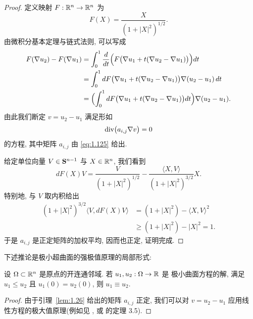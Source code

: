 \begin{proof}
定义映射 $F:\mathbb{R}^n\to\mathbb{R}^n$ 为
\begin{equation}
F(X)=\frac{X}{(1+|X|^2)^{1/2}}.
\label{eq:1.124}
\end{equation}
由微积分基本定理与链式法则, 可以写成
\begin{equation}
\begin{aligned}
F(\nabla u_2)-F(\nabla u_1)
&=\int_0^1\frac{d}{dt}
 \Bigl(F\bigl(\nabla u_1+t(\nabla u_2-\nabla u_1)\bigr)\Bigr)dt\\
&=\int_0^1 dF\bigl(\nabla u_1+t(\nabla u_2-\nabla u_1)\bigr)
 \nabla(u_2-u_1)\,dt\\
&=\Bigl(\int_0^1 dF\bigl(\nabla u_1+t(\nabla u_2-\nabla u_1)\bigr)dt
 \Bigr)\nabla(u_2-u_1).
\end{aligned}
\label{eq:1.125}
\end{equation}
由此我们断定 $v=u_2-u_1$ 满足形如
\begin{equation}
\operatorname{div}\bigl(a_{i,j}\nabla v\bigr)=0
\label{eq:1.126}
\end{equation}
的方程, 其中矩阵 $a_{i,j}$ 由 \eqref{eq:1.125} 给出.

给定单位向量 $V\in\mathbf{S}^{n-1}$ 与 $X\in\mathbb{R}^n$, 我们看到
\begin{equation}
dF(X)V=\frac{V}{(1+|X|^2)^{1/2}}
 -\frac{\langle X,V\rangle}{(1+|X|^2)^{3/2}}X.
\label{eq:1.127}
\end{equation}
特别地, 与 $V$ 取内积给出
\begin{equation}
\begin{aligned}
(1+|X|^2)^{3/2}\bigl\langle V,dF(X)V\bigr\rangle
&=(1+|X|^2)-\langle X,V\rangle^{2}\\
&\geq(1+|X|^2)-|X|^{2}=1.
\end{aligned}
\label{eq:1.128}
\end{equation}
于是 $a_{i,j}$ 是正定矩阵的加权平均, 因而也正定, 证明完成.
\end{proof}

下述推论是极小超曲面的强极值原理的局部形式:

\begin{corollary}
\label{cor:1.27}
设 $\Omega\subset\mathbb{R}^n$ 是原点的开连通邻域. 若 $u_1,u_2:\Omega\to\mathbb{R}$ 是
极小曲面方程的解, 满足 $u_1\leq u_2$ 且 $u_1(0)=u_2(0)$, 则
$u_1\equiv u_2$.
\end{corollary}

\begin{proof}
由于引理~\ref{lem:1.26} 给出的矩阵 $a_{i,j}$ 正定, 我们可以对 $v=u_2-u_1$
应用线性方程的极大值原理(例如见 \cite{HaLi}, 或 \cite{GiTr} 的定理 3.5).
\end{proof}

